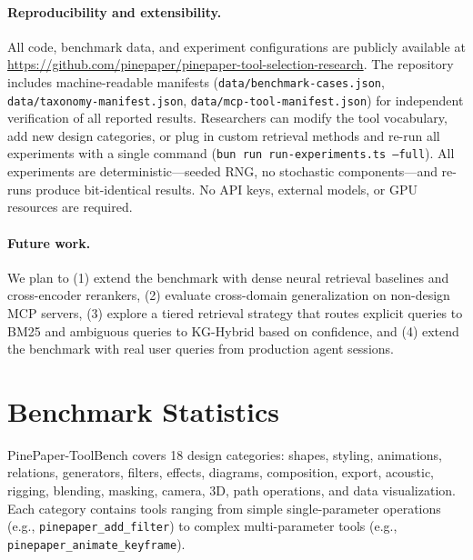 \documentclass[11pt,a4paper]{article}
\begin{document}
\paragraph{Reproducibility and extensibility.}
All code, benchmark data, and experiment configurations are publicly available at \url{https://github.com/pinepaper/pinepaper-tool-selection-research}. The repository includes machine-readable manifests (\texttt{data/benchmark-cases.json}, \texttt{data/taxonomy-manifest.json}, \texttt{data/mcp-tool-manifest.json}) for independent verification of all reported results. Researchers can modify the tool vocabulary, add new design categories, or plug in custom retrieval methods and re-run all experiments with a single command (\texttt{bun run run-experiments.ts --full}). All experiments are deterministic---seeded RNG, no stochastic components---and re-runs produce bit-identical results. No API keys, external models, or GPU resources are required.

\paragraph{Future work.}
We plan to (1) extend the benchmark with dense neural retrieval baselines and cross-encoder rerankers, (2) evaluate cross-domain generalization on non-design MCP servers, (3) explore a tiered retrieval strategy that routes explicit queries to BM25 and ambiguous queries to KG-Hybrid based on confidence, and (4) extend the benchmark with real user queries from production agent sessions.




\appendix
\section{Benchmark Statistics}
\label{app:benchmark}

PinePaper-ToolBench covers 18 design categories: shapes, styling, animations, relations, generators, filters, effects, diagrams, composition, export, acoustic, rigging, blending, masking, camera, 3D, path operations, and data visualization. Each category contains tools ranging from simple single-parameter operations (e.g., \texttt{pinepaper\_add\_filter}) to complex multi-parameter tools (e.g., \texttt{pinepaper\_animate\_keyframe}).
\end{document}
